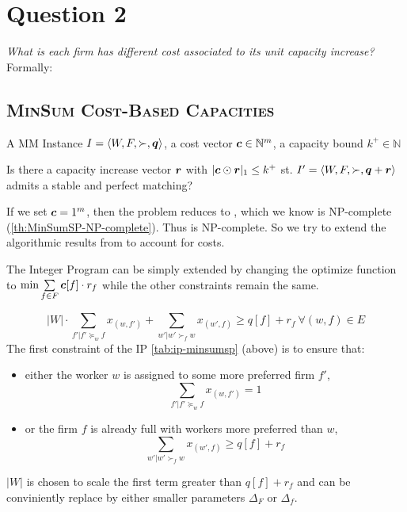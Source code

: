 \section{Question 2}

\textit{What is each firm has different cost associated to its unit capacity increase?} Formally:

\subsection{\textsc{MinSum Cost-Based Capacities}}

\begin{pinput}
  A MM Instance $I = \left< W, F, \succ, \boldsymbol{q} \right>$, a cost vector $\boldsymbol{c} \in \mathbb{N}^m$, a capacity bound $k^+ \in \mathbb{N}$
\end{pinput}
\begin{question}[\MinSumCSP]
  Is there a capacity increase vector $\boldsymbol{r}$ with $|\boldsymbol{c} \odot \boldsymbol{r}|_1 \leq k^+$ st. $I' = \left< W, F, \succ, \boldsymbol{q} + \boldsymbol{r} \right>$ admits a stable and perfect matching?
\end{question}

If we set $\boldsymbol{c} = 1^m$, then the problem reduces to \MinSumSP, which we know is NP-complete (\autoref{th:MinSumSP-NP-complete}). Thus \MinSumCSP is NP-complete. So we try to extend the algorithmic results from \MinSumSP to account for costs.

The Integer Program can be simply extended by changing the optimize function to $\min \sum\limits_{f \in F} \boldsymbol{c}[f] \cdot r_f$ while the other constraints remain the same.

\begin{tcolorbox}
  $$|W| \cdot \sum\limits_{f' | f' \succeq_w f} x_{(w, f')} + \sum\limits_{w' | w' \succ_f w} x_{(w', f)} \geq q[f] + r_f ~\forall (w, f) \in E$$
  The first constraint of the IP \autoref{tab:ip-minsumsp} (above)  is to ensure that:
  \begin{itemize}
    \item either the worker $w$ is assigned to some more preferred firm $f'$, \ie
          $$\sum\limits_{f' | f' \succeq_w f} x_{(w, f')} = 1$$
    \item or the firm $f$ is already full with workers more preferred than $w$, \ie
          $$\sum\limits_{w' | w' \succ_f w} x_{(w', f)} \geq q[f] + r_f$$
  \end{itemize}
  $|W|$ is chosen to scale the first term greater than $q[f] + r_f$ and can be conviniently replace by either smaller parameters $\Delta_F$ or $\Delta_f$.
\end{tcolorbox}

